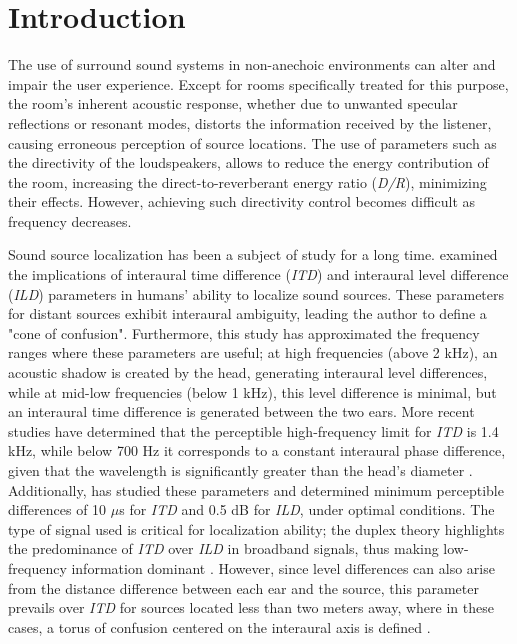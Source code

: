 \section{\large\textbf{Introduction}}

The use of surround sound systems in non-anechoic environments can alter and impair the user experience. Except for rooms specifically treated for this purpose, the room's inherent acoustic response, whether due to unwanted specular reflections or resonant modes, distorts the information received by the listener, causing erroneous perception of source locations. The use of parameters such as the directivity of the loudspeakers, allows to reduce the energy contribution of the room, increasing the direct-to-reverberant energy ratio (\textit{D/R}), minimizing their effects. However, achieving such directivity control becomes difficult as frequency decreases.

Sound source localization has been a subject of study for a long time. \textcite{Rayleigh} examined the implications of interaural time difference (\textit{ITD}) and interaural level difference (\textit{ILD}) parameters in humans' ability to localize sound sources. These parameters for distant sources exhibit interaural ambiguity, leading the author to define a "cone of confusion". Furthermore, this study has approximated the frequency ranges where these parameters are useful; at high frequencies (above 2 kHz), an acoustic shadow is created by the head, generating interaural level differences, while at mid-low frequencies (below 1 kHz), this level difference is minimal, but an interaural time difference is generated between the two ears. More recent studies have determined that the perceptible high-frequency limit for \textit{ITD} is 1.4 kHz, while below 700 Hz it corresponds to a constant interaural phase difference, given that the wavelength is significantly greater than the head's diameter \parencite{hflimit}. Additionally, \textcite{mills} has studied these parameters and determined minimum perceptible differences of 10 $\mu$s for \textit{ITD} and 0.5 dB for \textit{ILD}, under optimal conditions. The type of signal used is critical for localization ability; the duplex theory highlights the predominance of \textit{ITD} over \textit{ILD} in broadband signals, thus making low-frequency information dominant \parencite{duplex}. However, since level differences can also arise from the distance difference between each ear and the source, this parameter prevails over \textit{ITD} for sources located less than two meters away, where in these cases, a torus of confusion centered on the interaural axis is defined \parencite{tori}.

